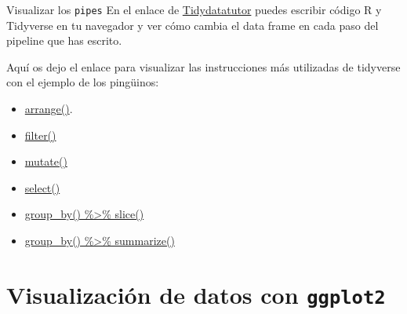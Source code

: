 \documentclass[
  ignorenonframetext,
  aspectratio=169]{beamer}
\begin{document}
\begin{frame}{Visualizar los \texttt{pipes}}
\protect\hypertarget{visualizar-los-pipes}{}
En el enlace de \href{https://tidydatatutor.com/}{Tidydatatutor} puedes
escribir código R y Tidyverse en tu navegador y ver cómo cambia el data
frame en cada paso del pipeline que has escrito.

Aquí os dejo el enlace para visualizar las instrucciones más utilizadas
de tidyverse con el ejemplo de los pingüinos:

\begin{itemize}
\item
  \href{https://tidydatatutor.com/vis.html\#trace=example-code/r_arrange.json}{arrange()}.
\item
  \href{https://tidydatatutor.com/vis.html\#trace=example-code/r_filter.json}{filter()}
\item
  \href{https://tidydatatutor.com/vis.html\#trace=example-code/r_mutate.json}{mutate()}
\item
  \href{https://tidydatatutor.com/vis.html\#trace=example-code/r_select.json}{select()}
\item
  \href{https://tidydatatutor.com/vis.html\#trace=example-code/r_grouped_slice.json}{group\_by()
  \%\textgreater\% slice()}
\item
  \href{https://tidydatatutor.com/vis.html\#trace=example-code/r_grouped_summarise.json}{group\_by()
  \%\textgreater\% summarize()}
\end{itemize}
\end{frame}

\hypertarget{visualizaciuxf3n-de-datos-con-ggplot2}{%
\section{\texorpdfstring{Visualización de datos con
\texttt{ggplot2}}{Visualización de datos con ggplot2}}\label{visualizaciuxf3n-de-datos-con-ggplot2}}
\end{document}
